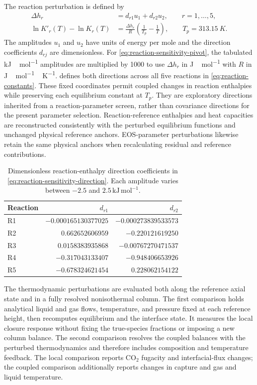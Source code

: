 The reaction perturbation is defined by
\begin{align}
\Delta h_r &= d_{r1}u_1+d_{r2}u_2,\qquad r=1,\ldots,5,
\label{eq:reaction-sensitivity-direction}\\
\ln K'_r(T)-\ln K_r(T)&=\frac{\Delta h_r}{R}\left(\frac{1}{T_p}-\frac{1}{T}\right),
\qquad T_p=\qty{313.15}{K}.
\label{eq:reaction-sensitivity-pivot}
\end{align}
The amplitudes $u_1$ and $u_2$ have units of energy per mole and the direction coefficients $d_{rj}$ are dimensionless.
For \cref{eq:reaction-sensitivity-pivot}, the tabulated \unit{kJ\,mol^{-1}} amplitudes are multiplied by 1000 to use $\Delta h_r$ in \unit{J\,mol^{-1}} with $R$ in \unit{J\,mol^{-1}\,K^{-1}}.
 defines both directions across all five reactions in \cref{eq:reaction-constants}.
These fixed coordinates permit coupled changes in reaction enthalpies while preserving each equilibrium constant at $T_p$.
They are exploratory directions inherited from a reaction-parameter screen, rather than covariance directions for the present parameter selection.
Reaction-reference enthalpies and heat capacities are reconstructed consistently with the perturbed equilibrium functions and unchanged physical reference anchors.
EOS-parameter perturbations likewise retain the same physical anchors when recalculating residual and reference contributions.

\begin{table}[pos=htbp]
\centering\small
\caption{Dimensionless reaction-enthalpy direction coefficients in \cref{eq:reaction-sensitivity-direction}. Each amplitude varies between $-2.5$ and $2.5\,\mathrm{kJ\,mol^{-1}}$.}
\label{tab:reaction-sensitivity-directions}
\begin{tabular}{@{}lrr@{}}
\toprule
Reaction & $d_{r1}$ & $d_{r2}$\\
\midrule
R1 & $-0.000165130377025$ & $-0.000273839533573$\\
R2 & $0.662652606959$ & $-0.220121619250$\\
R3 & $0.0158383935868$ & $-0.00767270471537$\\
R4 & $-0.317043133407$ & $-0.948406653926$\\
R5 & $-0.678324621454$ & $0.228062154122$\\
\bottomrule
\end{tabular}
\end{table}

The thermodynamic perturbations are evaluated both along the reference axial state and in a fully resolved nonisothermal column.
The first comparison holds analytical liquid and gas flows, temperature, and pressure fixed at each reference height, then recomputes equilibrium and the interface state.
It measures the local closure response without fixing the true-species fractions or imposing a new column balance.
The second comparison resolves the coupled balances with the perturbed thermodynamics and therefore includes composition and temperature feedback.
The local comparison reports CO$_2$ fugacity and interfacial-flux changes; the coupled comparison additionally reports changes in capture and gas and liquid temperature.

